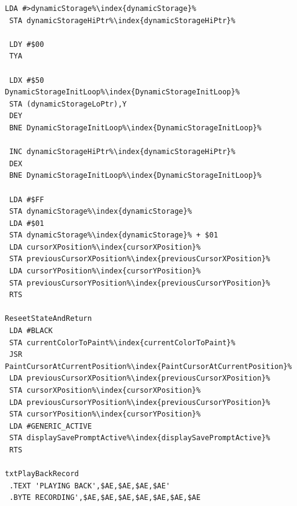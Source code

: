 \begin{minipage}[b]{0.33\linewidth}
\begin{lrbox}{\mybox}
\begin{lstlisting}[basicstyle=\ttfamily\tiny,escapechar=\%]
 LDA #>dynamicStorage%\index{dynamicStorage}%
 STA dynamicStorageHiPtr%\index{dynamicStorageHiPtr}%

 LDY #$00
 TYA

 LDX #$50
DynamicStorageInitLoop%\index{DynamicStorageInitLoop}%
 STA (dynamicStorageLoPtr),Y
 DEY
 BNE DynamicStorageInitLoop%\index{DynamicStorageInitLoop}%

 INC dynamicStorageHiPtr%\index{dynamicStorageHiPtr}%
 DEX
 BNE DynamicStorageInitLoop%\index{DynamicStorageInitLoop}%

 LDA #$FF
 STA dynamicStorage%\index{dynamicStorage}%
 LDA #$01
 STA dynamicStorage%\index{dynamicStorage}% + $01
 LDA cursorXPosition%\index{cursorXPosition}%
 STA previousCursorXPosition%\index{previousCursorXPosition}%
 LDA cursorYPosition%\index{cursorYPosition}%
 STA previousCursorYPosition%\index{previousCursorYPosition}%
 RTS

ReseetStateAndReturn
 LDA #BLACK
 STA currentColorToPaint%\index{currentColorToPaint}%
 JSR PaintCursorAtCurrentPosition%\index{PaintCursorAtCurrentPosition}%
 LDA previousCursorXPosition%\index{previousCursorXPosition}%
 STA cursorXPosition%\index{cursorXPosition}%
 LDA previousCursorYPosition%\index{previousCursorYPosition}%
 STA cursorYPosition%\index{cursorYPosition}%
 LDA #GENERIC_ACTIVE
 STA displaySavePromptActive%\index{displaySavePromptActive}%
 RTS

txtPlayBackRecord
 .TEXT 'PLAYING BACK',$AE,$AE,$AE,$AE'
 .BYTE RECORDING',$AE,$AE,$AE,$AE,$AE,$AE,$AE

\end{lstlisting}
\end{lrbox}%
\scalebox{0.8}{\usebox{\mybox}}
\end{minipage}
\hspace{-0.1cm}
